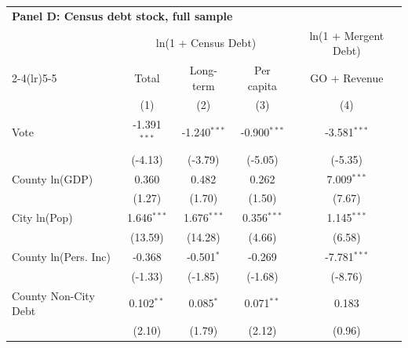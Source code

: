 \begingroup
\centering
\begin{tabular*}{\textwidth}{@{\extracolsep{\fill}}lcccc}
\multicolumn{5}{l}{\textbf{Panel D: Census debt stock, full sample}}\\

\addlinespace
   \toprule
                        & \multicolumn{3}{c}{ln(1 + Census Debt)} & \multicolumn{1}{c}{ln(1 + Mergent Debt)}\\  
   \cmidrule(lr){2-4}\cmidrule(lr){5-5}
                        & Total                     & Long-term                     & Per capita                           & GO + Revenue \\   
                        & (1)                       & (2)                           & (3)                                  & (4)\\  
   \midrule 
   Vote                 & -1.391$^{***}$            & -1.240$^{***}$                & -0.900$^{***}$                       & -3.581$^{***}$\\   
                        & (-4.13)                  & (-3.79)                      & (-5.05)                             & (-5.35)\\   
   County ln(GDP)       & 0.360                     & 0.482                         & 0.262                                & 7.009$^{***}$\\   
                        & (1.27)                   & (1.70)                       & (1.50)                              & (7.67)\\   
   City ln(Pop)         & 1.646$^{***}$             & 1.676$^{***}$                 & 0.356$^{***}$                        & 1.145$^{***}$\\   
                        & (13.59)                  & (14.28)                      & (4.66)                              & (6.58)\\   
   County ln(Pers. Inc) & -0.368                    & -0.501$^{*}$                  & -0.269                               & -7.781$^{***}$\\   
                        & (-1.33)                  & (-1.85)                      & (-1.68)                             & (-8.76)\\   
   County Non-City Debt & 0.102$^{**}$              & 0.085$^{*}$                   & 0.071$^{**}$                         & 0.183\\   
                        & (2.10)                   & (1.79)                       & (2.12)                              & (0.96)\\   

\end{tabular*}
